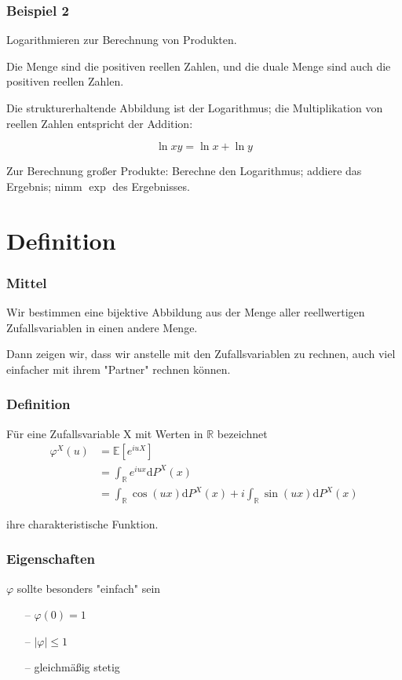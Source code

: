 \documentclass{beamer}
\newcommand{\R}{\mathbb{R}}
\newcommand{\E}{\mathbb{E}}
\newcommand\dint{\mathord{\mathrm{d}}}
\begin{document}
\begin{frame}
\frametitle{Beispiel 2}
Logarithmieren zur Berechnung von Produkten.

Die Menge sind die positiven reellen Zahlen, und die duale Menge sind auch die positiven reellen Zahlen.

Die strukturerhaltende Abbildung ist der Logarithmus; die Multiplikation von reellen Zahlen entspricht der Addition:

$$\ln xy = \ln x + \ln y $$

Zur Berechnung großer Produkte:
Berechne den Logarithmus; addiere das Ergebnis; nimm $\exp$ des Ergebnisses.



\end{frame}

\section{Definition}

\begin{frame}
\frametitle{Mittel}
Wir bestimmen eine bijektive Abbildung aus der Menge aller reellwertigen Zufallsvariablen in einen andere Menge.

Dann zeigen wir, dass wir anstelle mit den Zufallsvariablen zu rechnen, auch viel einfacher mit ihrem "Partner" rechnen können.
\end{frame}

\begin{frame}
\frametitle{Definition}
Für eine Zufallsvariable X mit Werten in $\R$ bezeichnet
\begin{align} \label{eq1}
\varphi^X(u) &= \E[e^{iuX}] \\
 & = \int_{\R} e^{iux} \dint P^X(x)\\
 & = \int_{\R} \cos(ux) \dint P^X(x) + i \int_{\R} \sin(ux) \dint P^X(x)
\end{align}

ihre charakteristische Funktion.

\end{frame}

\begin{frame}
\frametitle{Eigenschaften}
$\varphi$ sollte besonders "einfach" sein
\hfill \newline
\begin{itemize}
    \setlength\itemsep{1em}
    \item[--] $\varphi(0) = 1$
    \item[--] $|\varphi| \leq 1$
    \item[--] gleichmäßig stetig
\end{itemize}
\end{frame}
\end{document}
